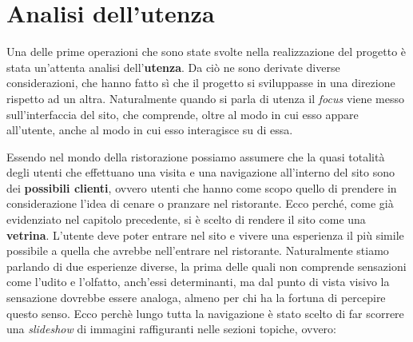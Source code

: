 \section{Analisi dell'utenza}

Una delle prime operazioni che sono state svolte nella realizzazione del progetto è stata un'attenta analisi dell'\textbf{utenza}. Da ciò ne sono derivate diverse considerazioni, che hanno fatto sì che il progetto si sviluppasse in una direzione rispetto ad un altra. Naturalmente quando si parla di utenza il \textit{focus} viene messo sull'interfaccia del sito, che comprende, oltre al modo in cui esso appare all'utente, anche al modo in cui esso interagisce su di essa. 

Essendo nel mondo della ristorazione possiamo assumere che la quasi totalità degli utenti che effettuano una visita e una navigazione all'interno del sito sono dei \textbf{possibili clienti}, ovvero utenti che hanno come scopo quello di prendere in considerazione l'idea di cenare o pranzare nel ristorante. Ecco perché, come già evidenziato nel capitolo precedente, si è scelto di rendere il sito come una \textbf{vetrina}. L'utente deve poter entrare nel sito e vivere una esperienza il più simile possibile a quella che avrebbe nell'entrare nel ristorante. Naturalmente stiamo parlando di due esperienze diverse, la prima delle quali non comprende sensazioni come l'udito e l'olfatto, anch'essi determinanti, ma dal punto di vista visivo la sensazione dovrebbe essere analoga, almeno per chi ha la fortuna di percepire questo senso. Ecco perchè lungo tutta la navigazione è stato scelto di far scorrere una \textit{slideshow} di immagini raffiguranti nelle sezioni topiche, ovvero:

\begin{itemize}


\end{itemize}
